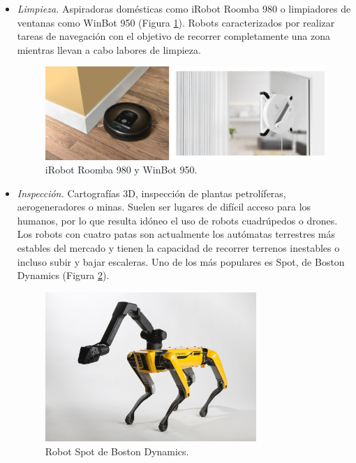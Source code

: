 \begin{itemize}
 \item \textit{Limpieza.} Aspiradoras domésticas como iRobot Roomba 980 o limpiadores de ventanas como WinBot 950 (Figura \ref{fig:robots_limpieza}). Robots caracterizados por realizar tareas de navegación con el objetivo de recorrer completamente una zona mientras llevan a cabo labores de limpieza.\\
 
\begin{figure} [h!]
  \begin{center}
    \includegraphics[width=12cm]{figs/robots_limpieza.png}
  \end{center}
  \caption{iRobot Roomba 980 y WinBot 950.}
  \label{fig:robots_limpieza}
\end{figure}

\item \textit{Inspección.} Cartografías 3D, inspección de plantas petrolíferas, aerogeneradores o minas. Suelen ser lugares de difícil acceso para los humanos, por lo que resulta idóneo el uso de robots cuadrúpedos o drones. Los robots con cuatro patas son actualmente los autómatas terrestres más estables del mercado y tienen la capacidad de recorrer terrenos inestables o incluso subir y bajar escaleras. Uno de los más populares es Spot, de Boston Dynamics (Figura \ref{fig:spot}).\\

\begin{figure} [h!]
  \begin{center}
    \includegraphics[width=8cm]{figs/spot.jpg}
  \end{center}
  \caption{Robot Spot de Boston Dynamics.}
  \label{fig:spot}
\end{figure}


\end{itemize}
